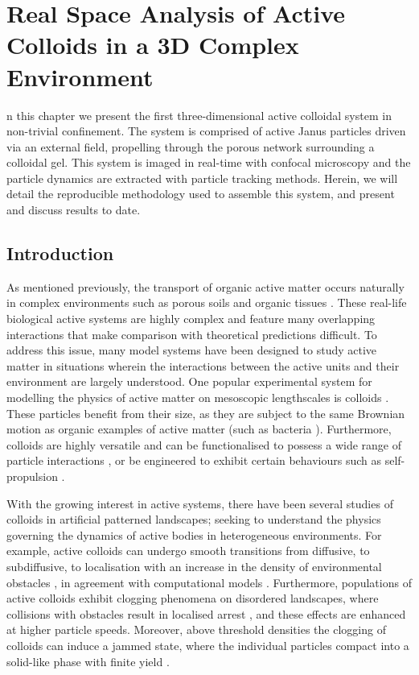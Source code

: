 %
% 
%
\let\textcircled=\pgftextcircled
\chapter{Real Space Analysis of Active Colloids in a 3D Complex Environment}
\label{chap:expSystem}

n this chapter we present the first three-dimensional active colloidal system in non-trivial confinement. The system is comprised of active Janus particles driven via an external field, propelling through the porous network surrounding a colloidal gel. This system is imaged in real-time with confocal microscopy and the particle dynamics are extracted with particle tracking methods. Herein, we will detail the reproducible methodology used to assemble this system, and present and discuss results to date. 




\section{Introduction}


As mentioned previously, the transport of organic active matter occurs naturally in complex environments such as porous soils \cite{gannon1991} and organic tissues \cite{isermann2017}.
These real-life biological active systems are highly complex and feature many overlapping interactions that make comparison with theoretical predictions difficult. To address this issue, many model systems have been designed to study active matter in situations wherein the interactions between the active units and their environment are largely understood. One popular experimental  system for modelling the physics of active matter on mesoscopic lengthscales is colloids \cite{vernerey2019}. These particles benefit from their size, as they are subject to the same Brownian motion as organic examples of active matter  (such as bacteria \cite{purcell2016}). 
 Furthermore, colloids are highly versatile and can be functionalised to possess a wide range of particle interactions \cite{zhang2017, pawar2010}, or be engineered to exhibit certain behaviours such as self-propulsion \cite{ebbens2016}. 
 
 With the growing interest in active systems, there have been several studies of colloids in artificial patterned landscapes; seeking to understand the physics governing the dynamics of active bodies in heterogeneous environments. For example, active colloids can undergo smooth transitions from diffusive, to subdiffusive, to localisation with an increase in the density of environmental obstacles \cite{morin2017}, in agreement with computational models \cite{zeitz2017,reichhardt2014}. Furthermore, populations of active colloids exhibit clogging phenomena on disordered landscapes, where collisions with obstacles result in localised arrest \cite{stoop2018, leyva2020}, and these effects are enhanced at higher particle speeds. Moreover, above threshold densities the clogging of colloids can induce a jammed state, where the individual particles compact into a solid-like phase with finite yield \cite{cates1998,stoop2018,lips2021}.


